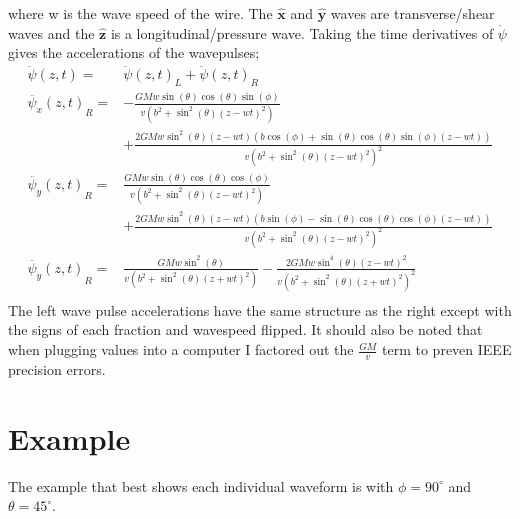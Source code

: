 \documentclass{report}
\begin{document}
where w is the wave speed of the wire. The $\mathbf{\hat x}$ and $\mathbf{\hat y}$ waves are transverse/shear waves and the $\mathbf{\hat z}$ is a longitudinal/pressure wave.
Taking the time derivatives of $\dot{\psi}$ gives the accelerations of the wavepulses;
\begin{align}
    \ddot{\psi} (z, t) =& {\ddot{\psi} (z, t)}_L + {\ddot{\psi} (z, t)}_R\\
    \nonumber {\ddot{\psi_x} (z, t)}_R =& -\frac{G M w \sin (\theta ) \cos (\theta ) \sin (\phi )}{v \left(b^2+\sin ^2(\theta ) {(z - w t)}^2\right) }\\
    & +\frac{2 G M w \sin ^2(\theta ) (z - w t) (b \cos (\phi )+\sin (\theta ) \cos (\theta ) \sin (\phi ) (z - w t))}{v {\left(b^2+\sin ^2(\theta ) {(z - w t)}^2\right)}^2}\\
    \nonumber {\ddot{\psi_y} (z, t)}_R =& \frac{G M w \sin (\theta ) \cos (\theta ) \cos (\phi )}{v \left(b^2+\sin ^2(\theta ) {(z - w t)}^2\right)}\\
    & +\frac{2 G M w \sin ^2(\theta ) (z - w t) (b \sin (\phi )-\sin (\theta ) \cos (\theta ) \cos (\phi ) (z - w t))}{v {\left(b^2+\sin ^2(\theta ) {(z - w t)}^2\right)}^2} \\
    \nonumber {\ddot{\psi_y} (z, t)}_R =& \frac{G M w \sin ^2(\theta )}{v \left(b^2+\sin ^2(\theta ) {(z + w t)}^2\right)} - \frac{2 G M w \sin ^4(\theta ) {(z - w t)}^2}{v \left(b^2+\sin ^2(\theta ) {(z + w t)}^2\right)^2}\\
\end{align} 
The left wave pulse accelerations have the same structure as the right except with the signs of each fraction and wavespeed flipped.
It should also be noted that when plugging values into a computer I factored out the $\frac{G M}{v}$ term to preven IEEE precision errors.
\section{Example}
The example that best shows each individual waveform is with $\phi = 90^\circ$ and $\theta = 45^\circ$.
\end{document}
